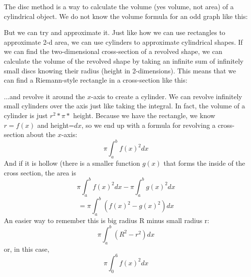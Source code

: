 \documentclass[../revisedmain.tex]{subfiles}
\begin{document}
The disc method is a way to calculate the volume (yes volume, not area) of a cylindrical object. We do not know the volume formula for an odd graph like this:
\begin{center}
\end{center}
But we can try and approximate it. Just like how we can use rectangles to approximate 2-d area, we can use cylinders to approximate cylindrical shapes. If we can find the two-dimensional cross-section of a revolved shape, we can calculate the volume of the revolved shape by taking an infinite sum of infinitely small discs knowing their radius (height in 2-dimensions). This means that we can find a Riemann-style rectangle in a cross-section like this:
\begin{center}
\end{center}
...and revolve it around the $x$-axis to create a cylinder. We can revolve infinitely small cylinders over the axis just like taking the integral. In fact, the volume of a cylinder is just $r^2 * \pi *$ height. Because we have the rectangle, we know $r=f(x)$ and height=$dx$, so we end up with a formula for revolving a cross-section about the $x$-axis:$$\pi\int_{a}^{b}f(x)^2dx$$ And if it is hollow (there is a smaller function $g(x)$ that forms the inside of the cross section, the area is $$\pi\int_{a}^{b}f(x)^2dx-\pi\int_{a}^{b}g(x)^2dx$$$$=\pi\int_{a}^{b}\left(f(x)^2-g(x)^2\right)dx$$ An easier way to remember this is big radius R minus small radius r:$$\pi\int_{a}^{b}\left(R^2-r^2\right)dx$$ or, in this case, $$\pi\int_{0}^{6}f(x)^2dx$$
\end{document}
